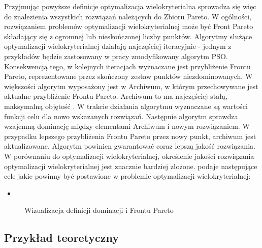 Przyjmując powyższe definicje optymalizacja wielokryterialna sprowadza się więc do znalezienia wszystkich rozwiązań należących do Zbioru Pareto. W ogólności, rozwiązaniem problemów optymalizacji wielokryterialnej może być Front Pareto składający się z ogromnej lub nieskończonej liczby punktów. Algorytmy służące optymalizacji wielokryterialnej działają najczęściej iteracyjnie - jednym z przykładów będzie zastosowany w pracy zmodyfikowany algorytm PSO. Konsekwencją tego, w kolejnych iteracjach wyznaczane jest przybliżenie Frontu Pareto, reprezentowane przez skończony zestaw punktów niezdominowanych. W większości algorytm wyposażony jest w Archiwum, w którym przechowywane jest aktualne przybliżenie Frontu Pareto. Archiwum to ma najczęściej stałą, maksymalną objętość \parencite{Banach2017}. W trakcie działania algorytmu wyznaczane są wartości funkcji celu dla nowo wskazanych rozwiązań. Następnie algorytm sprawdza wzajemną dominację między elementami Archiwum i nowym rozwiązaniem. W przypadku lepszego przybliżenia Frontu Pareto przez nowy punkt, archiwum jest aktualizowane. Algorytm powinien gwarantować coraz lepszą jakość rozwiązania. W porównaniu do optymalizacji wielokryterialnej, określenie jakości rozwiązania optymalizacji wielokryterialnej jest znacznie bardziej złożone. \cite{Zitzler2000} podaje następujące cele jakie powinny być postawione w problemie optymalizacji wielokryterialnej:
\begin{itemize}
	\item 
\end{itemize}

\begin{figure}[h]
	\centering
	\captionsetup{justification=centering}
	\caption{Wizualizacja definicji dominacji i Frontu Pareto}
	\label{ss}
\end{figure}








\subsection{Przykład teoretyczny}


